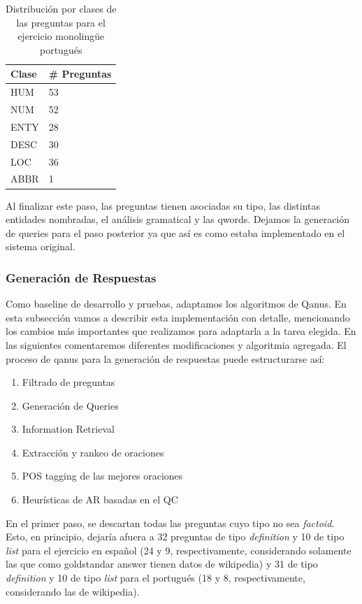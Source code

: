 \begin{table}
\centering
\begin{center}
\begin{tabular}{| l | l | }
\hline
Clase & \# Preguntas  \\ \hline
HUM &  53\\ \hline
NUM &  52\\ \hline        
ENTY &  28\\ \hline
DESC &  30\\ \hline
LOC &  36\\ \hline    
ABBR &  1\\ \hline
\end{tabular}
\caption{Distribución por clases de las preguntas para el ejercicio monolingüe portugués}
\label{table:qc-pt}
\end{center}
\end{table}

Al finalizar este paso, las preguntas tienen asociadas su tipo, las distintas entidades nombradas, el análisis gramatical y las qwords. Dejamos la generación de queries para el paso posterior ya que así es como estaba implementado en el sistema original.

\subsubsection{Generación de Respuestas}

Como baseline de desarrollo y pruebas, adaptamos los algoritmos de Qanus. En esta subsección vamos a describir esta implementación con detalle, mencionando los cambios más importantes que realizamos para adaptarla a la tarea elegida. En las siguientes comentaremos diferentes modificaciones y algoritmia agregada. El proceso de qanus para la generación de respuestas puede estructurarse así:
\begin{enumerate}
  \item Filtrado de preguntas
  \item Generación de Queries
  \item Information Retrieval
  \item Extracción y rankeo de oraciones
  \item POS tagging de las mejores oraciones
  \item Heurísticas de AR basadas en el QC
\end{enumerate}

En el primer paso, se descartan todas las preguntas cuyo tipo no sea \textit{factoid}. Esto, en principio, dejaría afuera a 32 preguntas de tipo \textit{definition} y 10 de tipo \textit{list} para el ejercicio en español (24 y 9, respectivamente, considerando solamente las que como goldstandar answer tienen datos de wikipedia) y 31 de tipo \textit{definition} y 10 de tipo \textit{list} para el portugués (18 y 8, respectivamente, considerando las de wikipedia). 

